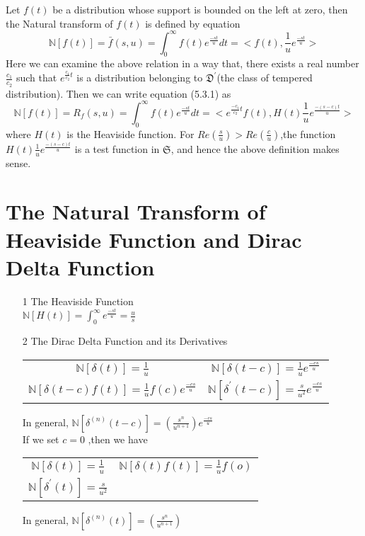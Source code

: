 Let $ f(t) $ be a distribution whose support is bounded on the left at zero, then the Natural transform of $ f(t) $ is defined by equation
\begin{equation}
\mathbb{N}[f(t)]=\bar{f}(s,u)=\int_{0}^{\infty}f(t)e^{\frac{-st}{u}}dt= <f(t),\frac{1}{u}e^{\frac{-st}{u}} >
\end{equation}
Here we can examine the above relation in a way that, there exists a real number $\frac{c_{1}}{c_{2}}$ such that $ e^{\frac{c_{1}}{c_{2}}t} $ is a distribution belonging to $\mathfrak{D}^{\prime}$(the class of tempered distribution). Then we can write equation (5.3.1) as
\begin{equation}
\mathbb{N}[f(t)]=R_{f}(s,u)=\int_{0}^{\infty}f(t)e^{\frac{-st}{u}}dt= <e^{\frac{-c_{1}}{c_{2}}t}f(t),H(t)\frac{1}{u}e^{\frac{-(s-c)t}{u}} >
\end{equation}
where $ H(t) $ is the Heaviside function. For $ Re(\frac{s}{u})> Re(\frac{c}{u})$,the function $ H(t)\frac{1}{u}e^{\frac{-(s-c)t}{u}} $ is a test function in $\mathfrak{S}$, and hence the above definition makes sense.
\section{The Natural Transform of Heaviside Function and Dirac Delta Function }
\begin{itemize}
\item[1]The Heaviside Function\\
$\mathbb{N}[H(t)]=\int_{0}^{\infty}e^{\frac{-st}{u}}=\frac{u}{s}$
\item[2]The Dirac Delta Function and its Derivatives
\begin{center}
\begin{tabular}{ c c }
$\mathbb{N}[\delta(t)] = \frac{1}{u}$ & $\mathbb{N}[\delta(t-c)] = \frac{1}{u}e^{\frac{-cs}{u}}$ \\ 
$\mathbb{N}[\delta(t-c)f(t)] = \frac{1}{u}f(c)e^{\frac{-cs}{u}}$ & $\mathbb{N}[\delta^{\prime}(t-c)] = \frac{s}{u^{2}}e^{\frac{-cs}{u}}$\\
\end{tabular}
\end{center}
In general, $\mathbb{N}[\delta^{(n)}(t-c)] = (\frac{s^{n}}{u^{n+1}})e^{\frac{-cs}{u}}$\\
If we set $c=0$ ,then we have 
\begin{center}
\begin{tabular}{ c c }
$\mathbb{N}[\delta(t)] = \frac{1}{u}$ & $\mathbb{N}[\delta(t)f(t)] = \frac{1}{u}f(o)$ \\ 
$\mathbb{N}[\delta^{\prime}(t)] = \frac{s}{u^{2}}$ \\
\end{tabular}
\end{center}
In general, $\mathbb{N}[\delta^{(n)}(t)] = (\frac{s^{n}}{u^{n+1}})$
\end{itemize}
